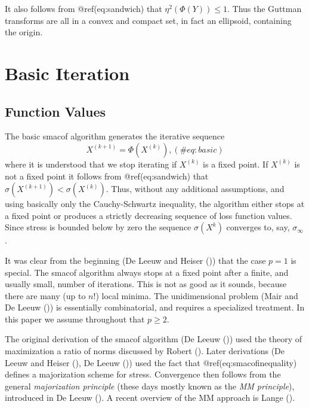 \documentclass[
  12pt,
  letterpaper,
  DIV=11,
  numbers=noendperiod]{scrartcl}
\begin{document}
It also follows from @ref(eq:sandwich) that \(\eta^2(\Phi(Y))\leq 1\).
Thus the Guttman transforms are all in a convex and compact set, in fact
an ellipsoid, containing the origin.

\section{Basic Iteration}\label{basic-iteration}

\subsection{Function Values}\label{function-values}

The basic smacof algorithm generates the iterative sequence
\begin{equation}
X^{(k+1)}=\Phi(X^{(k)}),
(\#eq:basic)
\end{equation} where it is understood that we stop iterating if
\(X^{(k)}\) is a fixed point. If \(X^{(k)}\) is not a fixed point it
follows from @ref(eq:sandwich) that
\(\sigma(X^{(k+1)})<\sigma(X^{(k)})\). Thus, without any additional
assumptions, and using basically only the Cauchy-Schwartz inequality,
the algorithm either stops at a fixed point or produces a strictly
decreasing sequence of loss function values. Since stress is bounded
below by zero the sequence \(\sigma(X^{k})\) converges to, say,
\(\sigma_\infty\).

It was clear from the beginning (De Leeuw and Heiser
()) that the case \(p=1\) is
special. The smacof algorithm always stops at a fixed point after a
finite, and usually small, number of iterations. This is not as good as
it sounds, because there are many (up to \(n!\)) local minima. The
unidimensional problem (Mair and De Leeuw
()) is essentially combinatorial,
and requires a specialized treatment. In this paper we assume throughout
that \(p\geq 2\).

The original derivation of the smacof algorithm (De Leeuw
()) used the theory of maximization a
ratio of norms discussed by Robert ().
Later derivations (De Leeuw and Heiser
(), De Leeuw
()) used the fact that
@ref(eq:smacofinequality) defines a majorization scheme for stress.
Convergence then follows from the general \emph{majorization principle}
(these days mostly known as the \emph{MM principle}), introduced in De
Leeuw (). A recent overview of the MM
approach is Lange ().
\end{document}
